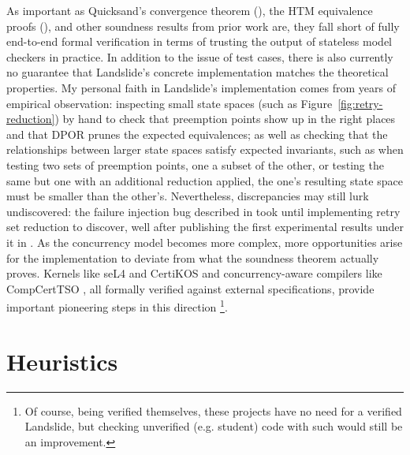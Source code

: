 As important as Quicksand's convergence theorem (\sect{\ref{sec:quicksand-soundness}}),
the HTM equivalence proofs (\sect{\ref{sec:tm-design}}),
and other soundness results from prior work are,
they fall short of fully end-to-end formal verification
in terms of trusting the output of stateless model checkers in practice.
In addition to the issue of test cases,
there is also currently no guarantee that Landslide's concrete implementation
matches the theoretical properties.
My personal faith in Landslide's implementation comes from years of empirical observation:
inspecting small state spaces
(such as Figure~\ref{fig:retry-reduction})
by hand
to check that preemption points show up in the right places
and that DPOR prunes the expected equivalences;
as well as checking that the relationships between larger state spaces satisfy expected invariants,
such as when testing two sets of preemption points, one a subset of the other,
or testing the same but one with an additional reduction applied,
the one's resulting state space must be smaller than the other's.
Nevertheless, discrepancies may still lurk undiscovered:
the failure injection bug described in \sect{\ref{sec:tm-eval-exp-setup}}
took until implementing retry set reduction to discover,
well after publishing the first experimental results under it in \cite{sigbovik-htm}.
As the concurrency model becomes more complex,
more opportunities arise for the implementation to deviate from what the soundness theorem actually proves.
Kernels like seL4 \cite{sel4} and CertiKOS \cite{certikos}
and concurrency-aware compilers like CompCertTSO \cite{compcerttso},
all formally verified against external specifications,
provide important pioneering steps in this direction
\footnote{Of course, being verified themselves, these projects have no need for a verified Landslide,
but checking unverified (e.g. student) code with such would still be an improvement.}.

\section{Heuristics}

